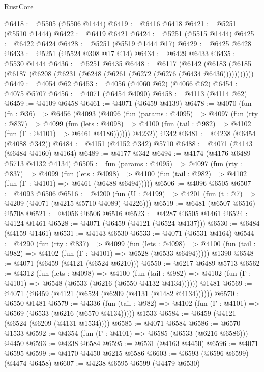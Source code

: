 \begin{lexlean}{RustCore}
\begin{coremodule}
@6418 := @5505 (@5506 @1444)
@6419 := @6416 @6418
@6421 := @5251 (@5510 @1444)
@6422 := @6419 @6421
@6424 := @5251 (@5515 @1444)
@6425 := @6422 @6424
@6428 := @5251 (@5519 @1444 @17)
@6429 := @6425 @6428
@6433 := @5251 (@5524 @308 @17 @14)
@6434 := @6429 @6433
@6435 := @5530 @1444
@6436 := @5251 @6435
@6448 := @6117
    (@6142 (@6183 (@6185 (@6187 (@6208 (@6231 (@6248 (@6261 (@6272 (@6276 (@6434 @6436)))))))))))
@6449 := @4054 @62
@6453 := @4056 (@4060 @62) (@4066 @62)
@6454 := @4075 @5707
@6456 := @4071 (@6454 @4090)
@6458 := @4113 (@4114 @62)
@6459 := @4109 @6458
@6461 := @4071 (@6459 @4139)
@6478 := @4070
    (fun (fn : @36) =>
    @6456
      (@4093
        (@4096
          (fun (params : @4095) =>
          @4097
            (fun (rty : @837) =>
            @4099
              (fun (lets : @4098) =>
              @4100 (fun (tail : @982) => @4102 (fun (Γ : @4101) => @6461 @4186))))))
        @4232))
    @342
@6481 := @4238 (@6454 (@4088 @342))
@6484 := @4151 (@4152 @342) @5710
@6488 := @4071 (@4143 (@6484 @4160) @4164)
@6489 := @4177 @342
@6494 := @4174 (@4176 @6489 @5713 @4132 @4134)
@6505 := fun (params : @4095) =>
  @4097
    (fun (rty : @837) =>
    @4099
      (fun (lets : @4098) =>
      @4100 (fun (tail : @982) => @4102 (fun (Γ : @4101) => @6461 (@6488 @6494)))))
@6506 := @4096 @6505
@6507 := @4093 @6506
@6516 := @4200 (fun (U : @4199) => @4201 (fun (t : @7) => @4209 (@4071 (@4215 @5710 @4089) @4226)))
@6519 := @6481 (@6507 @6516) @5708
@6521 := @4056 @6506 @6516
@6523 := @4287 @6505 @1461
@6524 := @4124 @1461
@6528 := @4071 (@6459 (@4121 (@6524 @4137)))
@6530 := @6484 (@4159 @1461)
@6531 := @4143 @6530
@6533 := @4071 (@6531 @4164)
@6544 := @4290
    (fun (rty : @837) =>
    @4099
      (fun (lets : @4098) =>
      @4100 (fun (tail : @982) => @4102 (fun (Γ : @4101) => @6528 (@6533 @6494)))))
    @1390
@6548 := @4071 (@6459 (@4121 (@6524 @6210)))
@6550 := @6217 @6489 @5713
@6562 := @4312
    (fun (lets : @4098) =>
    @4100
      (fun (tail : @982) => @4102 (fun (Γ : @4101) => @6548 (@6533 (@6216 (@6550 @4132 @4134))))))
    @1481
@6569 := @4071 (@6459 (@4121 (@6524 (@6209 (@4131 (@1482 @4134))))))
@6570 := @6550 @1481
@6579 := @4336
    (fun (tail : @982) => @4102 (fun (Γ : @4101) => @6569 (@6533 (@6216 (@6570 @4134)))))
    @1533
@6584 := @6459 (@4121 (@6524 (@6209 (@4131 @1534))))
@6585 := @4071 @6584
@6586 := @6570 @1533
@6592 := @4354 (fun (Γ : @4101) => @6585 (@6533 (@6216 @6586))) @4450
@6593 := @4238 @6584
@6595 := @6531 (@4163 @4450)
@6596 := @4071 @6595
@6599 := @4170 @4450 @6215 @6586
@6603 := @6593 (@6596 @6599) (@4474 @6458)
@6607 := @4238 @6595 @6599 (@4479 @6530)

\end{coremodule}
\end{lexlean}
